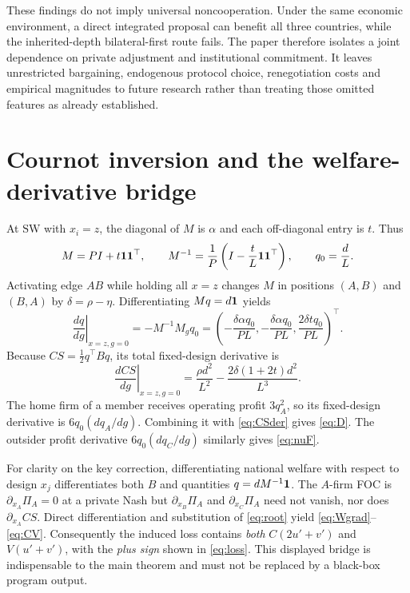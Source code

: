\documentclass[11pt,a4paper]{article}
\theoremstyle{remark}\newtheorem{remark}[theorem]{Remark}
\newcommand{\SW}{\mathrm{SW}}\newcommand{\SU}{\mathrm{SU}}\newcommand{\IS}{\mathrm{IS}}
\begin{document}
These findings do not imply universal noncooperation. Under the same economic environment, a direct integrated proposal can benefit all three countries, while the inherited-depth bilateral-first route fails. The paper therefore isolates a joint dependence on private adjustment and institutional commitment. It leaves unrestricted bargaining, endogenous protocol choice, renegotiation costs and empirical magnitudes to future research rather than treating those omitted features as already established.

\appendix
\section{Cournot inversion and the welfare-derivative bridge}\label{app:bridge}
At $\SW$ with $x_i=z$, the diagonal of $M$ is $\alpha$ and each off-diagonal entry is $t$. Thus
\begin{equation}\label{eq:inv}
M=P I+t\boldsymbol{1}\boldsymbol{1}^{\top},\qquad
M^{-1}=\frac1P\left(I-\frac{t}{L}\boldsymbol{1}\boldsymbol{1}^{\top}\right),\qquad q_0=\frac dL.
\end{equation}
Activating edge $AB$ while holding all $x=z$ changes $M$ in positions $(A,B)$ and $(B,A)$ by $\delta=\rho-\eta$. Differentiating $Mq=d\boldsymbol{1}$ yields
\begin{equation}\label{eq:quantityDer}
\left.\frac{dq}{dg}\right|_{x=z,g=0}=-M^{-1}M_gq_0
=\left(-\frac{\delta\alpha q_0}{PL},-\frac{\delta\alpha q_0}{PL},\frac{2\delta t q_0}{PL}\right)^\top.
\end{equation}
Because $CS=\tfrac12q^\top Bq$, its total fixed-design derivative is
\begin{equation}\label{eq:CSder}
\left.\frac{dCS}{dg}\right|_{x=z,g=0}
=\frac{\rho d^2}{L^2}-\frac{2\delta(1+2t)d^2}{L^3}.
\end{equation}
The home firm of a member receives operating profit $3q_A^2$, so its fixed-design derivative is $6q_0(dq_A/dg)$. Combining it with \eqref{eq:CSder} gives \eqref{eq:D}. The outsider profit derivative $6q_0(dq_C/dg)$ similarly gives \eqref{eq:nuF}.

For clarity on the key correction, differentiating national welfare with respect to design $x_j$ differentiates both $B$ and quantities $q=dM^{-1}\boldsymbol{1}$. The $A$-firm FOC is $\partial_{x_A}\Pi_A=0$ at a private Nash but $\partial_{x_B}\Pi_A$ and $\partial_{x_C}\Pi_A$ need not vanish, nor does $\partial_{x_A}CS$. Direct differentiation and substitution of \eqref{eq:root} yield \eqref{eq:Wgrad}--\eqref{eq:CV}. Consequently the induced loss contains \emph{both} $C(2u'+v')$ and $V(u'+v')$, with the \emph{plus sign} shown in \eqref{eq:loss}. This displayed bridge is indispensable to the main theorem and must not be replaced by a black-box program output.
\end{document}

